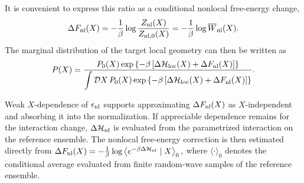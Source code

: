 \documentclass[11pt]{article}
\begin{document}
It is convenient to express this ratio as a conditional nonlocal free-energy change,
\begin{equation}
\Delta F_{\rm nl}(X)
=
-\frac{1}{\beta}
\log
\frac{Z_{\rm nl}(X)}
{Z_{{\rm nl},0}(X)}
=
-\frac{1}{\beta}
\log\overline W_{\rm nl}(X).
\label{eq:DeltaFnl}
\end{equation}
The marginal distribution of the target local geometry can then be written as
\begin{equation}
P(X)
=
\frac{
P_0(X)
\exp\left\{
-\beta\left[
\Delta\mathcal H_{\rm loc}(X)
+
\Delta F_{\rm nl}(X)
\right]
\right\}
}{
\displaystyle
\int\mathcal D X\,
P_0(X)
\exp\left\{
-\beta\left[
\Delta\mathcal H_{\rm loc}(X)
+
\Delta F_{\rm nl}(X)
\right]
\right\}
}.
\label{eq:relative_reweighting}
\end{equation}

Weak \(X\)-dependence of \(\epsilon_{\rm nl}\) supports approximating \(\Delta F_{\rm nl}(X)\) as \(X\)-independent and absorbing it into the normalization. If appreciable dependence remains for the interaction change, \(\Delta\mathcal H_{\rm nl}\) is evaluated from the parametrized interaction on the reference ensemble. 
The nonlocal free-energy correction is then estimated directly from
\(\Delta F_{\rm nl}(X)
=
-\frac{1}{\beta}
\log
\left\langle
e^{-\beta\Delta\mathcal H_{\rm nl}}
\mid X
\right\rangle_0,\)
where \(\langle\cdot\rangle_0\) denotes the conditional average evaluated from finite random-wave samples of the reference ensemble.
\end{document}
